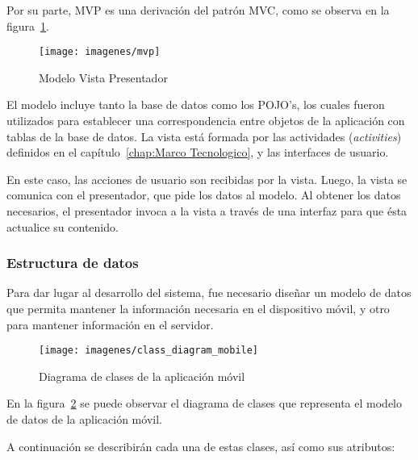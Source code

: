 Por su parte, MVP es una derivación del patrón MVC, como se observa en la figura~\ref{fig:mvp}.

\begin{figure}[ht]
  \centering
  \texttt{[image: imagenes/mvp]}
  \caption{Modelo Vista Presentador}
  \label{fig:mvp}
\end{figure}

El modelo incluye tanto la base de datos como los POJO's, los cuales fueron utilizados para establecer una correspondencia entre objetos de la aplicación con tablas de la base de datos. La vista está formada por las actividades (\textit{activities}) definidos en el capítulo~\ref{chap:Marco Tecnologico}, y las interfaces de usuario.
 
En este caso, las acciones de usuario son recibidas por la vista. Luego, la vista se comunica con el presentador, que pide los datos al modelo. Al obtener los datos necesarios, el presentador invoca a la vista a través de una interfaz para que ésta actualice su contenido.

\subsubsection{Estructura de datos}

Para dar lugar al desarrollo del sistema, fue necesario diseñar un modelo de datos que permita mantener la información necesaria en el dispositivo móvil, y otro para mantener información en el servidor.


\begin{figure}[ht]
  \centering
  \texttt{[image: imagenes/class\_diagram\_mobile]}
  \caption{Diagrama de clases de la aplicación móvil}
  \label{fig:diagramaClasesMovil}
\end{figure}

En la figura~\ref{fig:diagramaClasesMovil} se puede observar el diagrama de clases que representa el modelo de datos de la aplicación móvil. 


A continuación se describirán cada una de estas clases, así como sus atributos:

